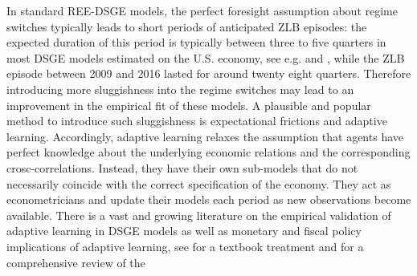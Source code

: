 \documentclass[12pt,reqno]{article}
\numberwithin{equation}{section}
\begin{document}
\noindent
In standard REE-DSGE models, the perfect foresight assumption about regime switches typically leads to short periods of anticipated ZLB episodes: the expected duration of this period is typically between three to five quarters in most DSGE models estimated on the U.S. economy, see e.g. \cite{linde2017estimation} and \cite{ji2016government}, while the ZLB episode between 2009 and 2016 lasted for around twenty eight quarters. Therefore introducing more sluggishness into the regime switches may lead to an improvement in the empirical fit of these models. A plausible and popular method to introduce such sluggishness is expectational frictions and adaptive learning. Accordingly, adaptive learning relaxes the assumption that agents have perfect knowledge about the underlying economic relations and  the corresponding crosc-correlations. Instead, they have their own sub-models that do not necessarily coincide with the correct specification of the economy. They act as econometricians and update their models each period as new observations become available. There is a vast and growing literature on the empirical validation of adaptive learning in DSGE models as well as monetary and fiscal policy implications of adaptive learning, see \cite{evans2012learning} for a textbook treatment and \cite{woodford2013macroeconomic} for a comprehensive review of the
\end{document}
